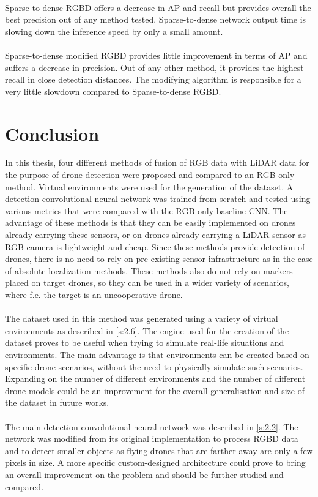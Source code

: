 \documentclass[twoside]{ctuthesis}
\theoremstyle{plain}
\theoremstyle{definition}
\theoremstyle{note}
\begin{document}
\\
Sparse-to-dense RGBD offers a decrease in AP and recall but provides overall the best precision out of any method tested. Sparse-to-dense network output time is slowing down the inference speed by only a small amount.\\
\\
Sparse-to-dense modified RGBD provides little improvement in terms of AP and suffers a decrease in precision. Out of any other method, it provides the highest recall in close detection distances. The modifying algorithm is responsible for a very little slowdown compared to Sparse-to-dense RGBD.
\chapter{Conclusion}
In this thesis, four different methods of fusion of RGB data with LiDAR data for the purpose of drone detection were proposed and compared to an RGB only method. Virtual environments were used for the generation of the dataset. A detection convolutional neural network was trained from scratch and tested using various metrics that were compared with the RGB-only baseline CNN. The advantage of these methods is that they can be easily implemented on drones already carrying these sensors, or on drones already carrying a LiDAR sensor as RGB camera is lightweight and cheap. Since these methods provide detection of drones, there is no need to rely on pre-existing sensor infrastructure as in the case of absolute localization methods. These methods also do not rely on markers placed on target drones, so they can be used in a wider variety of scenarios, where f.e. the target is an uncooperative drone.\\
\\
The dataset used in this method was generated using a variety of virtual environments as described in \autoref{s:2.6}. The engine used for the creation of the dataset proves to be useful when trying to simulate real-life situations and environments. The main advantage is that environments can be created based on specific drone scenarios, without the need to physically simulate such scenarios. Expanding on the number of different environments and the number of different drone models could be an improvement for the overall generalisation and size of the dataset in future works.\\
\\
The main detection convolutional neural network was described in \autoref{s:2.2}. The network was modified from its original implementation to process RGBD data and to detect smaller objects as flying drones that are farther away are only a few pixels in size. A more specific custom-designed architecture could prove to bring an overall improvement on the problem and should be further studied and compared.\\
\end{document}
